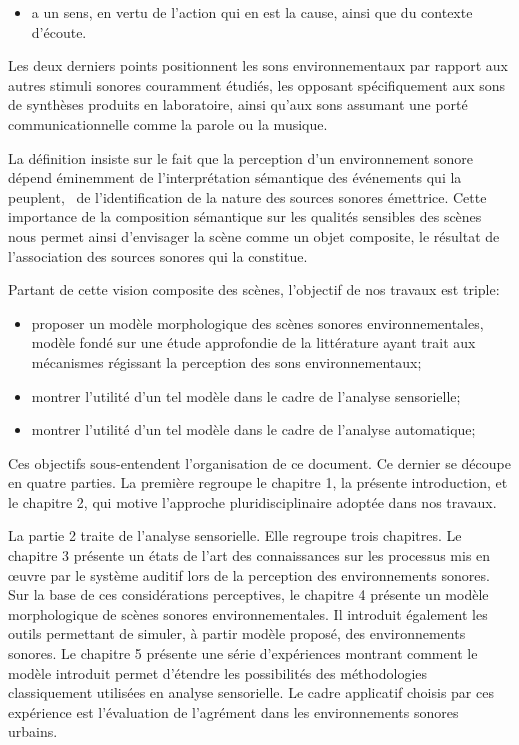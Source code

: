 \begin{itemize}
\setcounter{enumi}{2}
\item a un sens, en vertu de l'action qui en est la cause, ainsi que du contexte d'écoute.
\end{itemize}

Les deux derniers points positionnent les sons environnementaux par rapport aux autres stimuli sonores couramment étudiés, les opposant spécifiquement aux sons de synthèses produits en laboratoire, ainsi qu'aux sons assumant une porté communicationnelle  comme la parole ou la musique.

La définition insiste sur le fait que la perception d'un environnement sonore dépend éminemment de l'interprétation sémantique des événements qui la peuplent, \ie~de l'identification de la nature des sources sonores émettrice. Cette importance de la composition sémantique sur les qualités sensibles des scènes nous permet ainsi d'envisager la scène comme un objet composite, le résultat de l'association des sources sonores qui la constitue.

Partant de cette vision composite des scènes, l'objectif de nos travaux est triple:

\begin{itemize}
\item proposer un modèle morphologique des scènes sonores environnementales, modèle fondé sur une étude approfondie de la littérature ayant trait aux mécanismes régissant la perception des sons environnementaux;
\item montrer l'utilité d'un tel modèle dans le cadre de l'analyse sensorielle;
\item montrer l'utilité d'un tel modèle dans le cadre de l'analyse automatique;
\end{itemize}

Ces objectifs sous-entendent l'organisation de ce document. Ce dernier se découpe en quatre parties. La première regroupe le chapitre 1, la présente introduction, et le chapitre 2, qui motive l'approche pluridisciplinaire adoptée dans nos travaux.

La partie 2 traite de l'analyse sensorielle. Elle regroupe trois chapitres. Le chapitre 3 présente un états de l'art des connaissances sur les processus mis en œuvre par le système auditif lors de la perception des environnements sonores. Sur la base de ces considérations perceptives, le chapitre 4 présente un modèle morphologique de scènes sonores environnementales. Il introduit également les outils permettant de simuler, à partir modèle proposé, des environnements sonores. Le chapitre 5  présente une série d'expériences montrant comment le modèle introduit permet d'étendre les possibilités des méthodologies classiquement utilisées en analyse sensorielle. Le cadre applicatif choisis par ces expérience est l'évaluation de l'agrément dans les environnements sonores urbains.

